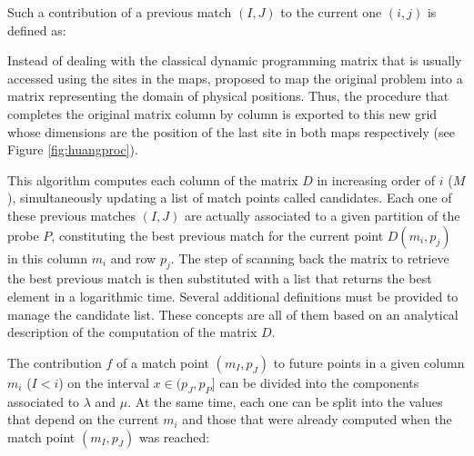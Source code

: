 {Such a contribution of a previous match $(I,J)$ to the current one $(i,j)$ is defined as:

\begin{center}
\end{center}

Instead of dealing with the classical dynamic programming matrix that is usually accessed using the
sites in the maps, \citet{myers:1992a} proposed to map the original problem into a matrix representing
the domain of physical positions. Thus, the procedure that completes the original matrix column by column
is exported to this new grid whose dimensions are the position of the last site in both maps respectively
(see Figure \ref{fig:huangproc}).

This algorithm computes each column of the matrix $D$ in increasing order of $i$ ($M$), simultaneously 
updating a list of match points called candidates. Each one of these previous matches $(I,J)$ are actually
associated to a given partition of the probe $P$, constituting the best previous match for the current
point $D(m_i,p_j)$ in this column $m_i$ and row $p_j$. The step of scanning back the matrix to retrieve
the best previous match is then substituted with a list that returns the best element in a logarithmic time.
Several additional definitions must be provided to manage the candidate list. These concepts are all of them
based on an analytical description of the computation of the matrix $D$. 

The contribution $f$ of a match point $(m_I,p_J)$ to future points in a given column $m_i$ ($I<i$) on the 
interval $x \in (p_J,p_P]$ can be divided into the components associated to $\lambda$ and $\mu$. At the same time, each one can be split into the values that depend on the current $m_i$ and those that were already 
computed when the match point $(m_I,p_J)$ was reached:

\begin{center}
\end{center}

}
